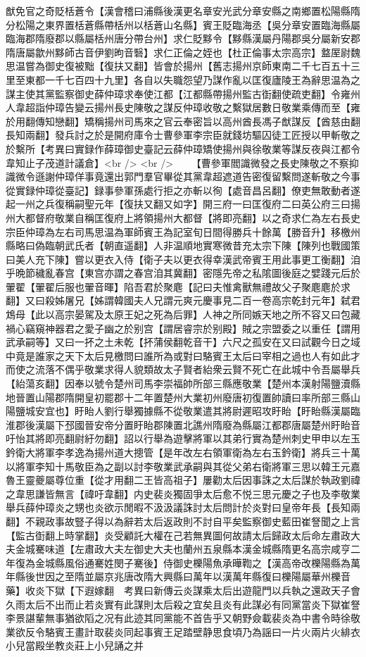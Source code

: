 猷免官之奇貶栝蒼令【漢會稽曰浦縣後漢更名章安光武分章安縣之南鄉置松陽縣隋分松陽之東界置栝蒼縣帶栝州以栝蒼山名縣】賓王貶臨海丞【吳分章安置臨海縣屬臨海郡隋廢郡以縣屬栝州唐分帶台州】求仁貶黟令【黟縣漢屬丹陽郡吳分屬新安郡隋唐屬歙州黟師古音伊劉昫音䃜】求仁正倫之姪也【杜正倫事太宗高宗】盩厔尉魏思温嘗為御史復被黜【復扶又翻】皆會於揚州【舊志揚州京師東南二千七百五十三里至東都一千七百四十九里】各自以失職怨望乃謀作亂以匡復廬陵王為辭思温為之謀主使其黨監察御史薛仲璋求奉使江都【江都縣帶揚州監古衘翻使疏吏翻】令雍州人韋超詣仲璋告變云揚州長史陳敬之謀反仲璋收敬之繫獄居數日敬業乘傳而至【雍於用翻傳知戀翻】矯稱揚州司馬來之官云奉密旨以高州酋長馮子猷謀反【酋慈由翻長知兩翻】發兵討之於是開府庫令士曹參軍李宗臣就錢坊驅囚徒工匠授以甲斬敬之於繫所【考異曰實録作薛璋御史臺記云薛仲璋矯使揚州與徐敬業等謀反夜與江都令韋知止子茂道計議倉】<br />
<br />
　　【曹參軍閻識微發之長史陳敬之不察抑識微令遜謝仲璋佯事竟還出郭門羣官畢從其黨韋超遮道告密復留繫問遂斬敬之今事從實録仲璋從臺記】録事參軍孫處行拒之亦斬以徇【處音昌呂翻】僚吏無敢動者遂起一州之兵復稱嗣聖元年【復扶又翻又如字】開三府一曰匡復府二曰英公府三曰揚州大都督府敬業自稱匡復府上將領揚州大都督【將即亮翻】以之奇求仁為左右長史宗臣仲璋為左右司馬思温為軍師賓王為記室旬日間得勝兵十餘萬【勝音升】移檄州縣略曰偽臨朝武氏者【朝直遥翻】人非温順地實寒微昔充太宗下陳【陳列也戰國策曰美人充下陳】嘗以更衣入侍【衛子夫以更衣得幸漢武帝賓王用此事更工衡翻】洎乎晩節穢亂春宫【東宫亦謂之春宫洎其冀翻】密隱先帝之私隂圖後庭之嬖踐元后於翬翟【翬翟后服也翬音暉】陷吾君於聚麀【記曰夫惟禽獸無禮故父子聚麀麀於求翻】又曰殺姊屠兄【姊謂韓國夫人兄謂元爽元慶事見二百一卷高宗乾封元年】弑君鴆母【此以高宗晏駕及太原王妃之死為后罪】人神之所同嫉天地之所不容又曰包藏禍心竊窺神器君之愛子幽之於别宫【謂居睿宗於别殿】賊之宗盟委之以重任【謂用武承嗣等】又曰一抔之土未乾【抔蒲侯翻乾音干】六尺之孤安在又曰試觀今日之域中竟是誰家之天下太后見檄問曰誰所為或對曰駱賓王太后曰宰相之過也人有如此才而使之流落不偶乎敬業求得人貌類故太子賢者紿衆云賢不死亡在此城中令吾屬舉兵【紿蕩亥翻】因奉以號令楚州司馬李崇福帥所部三縣應敬業【楚州本漢射陽鹽瀆縣地晉置山陽郡隋開皇初罷郡十二年置楚州大業初州廢唐初復置帥讀曰率所部三縣山陽鹽城安宜也】盱眙人劉行舉獨據縣不從敬業遣其將尉遲昭攻盱眙【盱眙縣漢屬臨淮郡後漢屬下邳國晉安帝分置盱眙郡陳置北譙州隋廢為縣屬江都郡唐屬楚州盱眙音吁怡其將即亮翻尉紆勿翻】詔以行舉為遊擊將軍以其弟行實為楚州刺史甲申以左玉鈐衛大將軍李孝逸為揚州道大摠管【是年改左右領軍衛為左右玉鈐衛】將兵三十萬以將軍李知十馬敬臣為之副以討李敬業武承嗣與其從父弟右衛將軍三思以韓王元嘉魯王靈夔屬尊位重【從才用翻二王皆高祖子】屢勸太后因事誅之太后謀於執政劉禕之韋思謙皆無言【禕吁韋翻】内史裴炎獨固爭太后愈不悦三思元慶之子也及李敬業舉兵薛仲璋炎之甥也炎欲示閒暇不汲汲議誅討太后問計於炎對曰皇帝年長【長知兩翻】不親政事故豎子得以為辭若太后返政則不討自平矣監察御史藍田崔詧聞之上言【監古衘翻上時掌翻】炎受顧託大權在己若無異圖何故請太后歸政太后命左肅政大夫金城騫味道【左肅政大夫左御史大夫也蘭州五泉縣本漢金城縣隋更名高宗咸亨二年復為金城縣風俗通騫姓閔子騫後】侍御史櫟陽魚承曄鞫之【漢高帝改櫟陽縣為萬年縣後世因之至隋並屬京兆唐改隋大興縣曰萬年以漢萬年縣復曰櫟陽屬華州櫟音藥】收炎下獄【下遐嫁翻　考異曰新傳云炎謀乘太后出遊龍門以兵執之還政天子會久雨太后不出而止若炎實有此謀則太后殺之宜矣且炎有此謀必有同黨當炎下獄崔詧李景諶輩無事猶欲䧟之况有此迹其同黨能不首告乎又朝野僉載裴炎為中書令時徐敬業欲反令駱賓王畫計取裴炎同起事賓王足踏壁静思食頃乃為謡曰一片火兩片火緋衣小兒當殿坐教炎莊上小兒誦之并